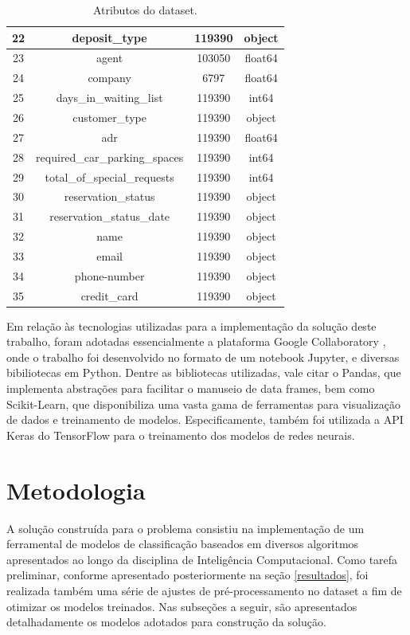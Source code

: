 \documentclass{homework}
\begin{document}
\begin{table}[h!]
\begin{tabular}{|c|c|c|c|}
        \hline
        22 & deposit\_type & 119390 & object \\
        \hline
        23 & agent & 103050 & float64 \\
        \hline
        24 & company & 6797 & float64 \\
        \hline
        25 & days\_in\_waiting\_list & 119390 & int64 \\
        \hline
        26 & customer\_type & 119390 & object \\
        \hline
        27 & adr & 119390 & float64 \\
        \hline
        28 & required\_car\_parking\_spaces & 119390 & int64 \\
        \hline
        29 & total\_of\_special\_requests & 119390 & int64 \\
        \hline
        30 & reservation\_status & 119390 & object \\
        \hline
        31 & reservation\_status\_date & 119390 & object \\
        \hline
        32 & name & 119390 & object \\
        \hline
        33 & email & 119390 & object \\
        \hline
        34 & phone-number & 119390 & object \\
        \hline
        35 & credit\_card & 119390 & object \\
        \hline
    \end{tabular}
    \caption{Atributos do dataset.}
    \label{attributes}
\end{table}

Em relação às tecnologias utilizadas para a implementação da solução deste trabalho, foram adotadas essencialmente a
plataforma Google Collaboratory \cite{colab}, onde o trabalho foi desenvolvido no formato de um notebook Jupyter, e
diversas bibiliotecas em Python. Dentre as bibliotecas utilizadas, vale citar o Pandas, que implementa abstrações para
facilitar o manuseio de data frames, bem como Scikit-Learn, que disponibiliza uma vasta gama de ferramentas para
visualização de dados e treinamento de modelos. Especificamente, também foi utilizada a API Keras do TensorFlow para o treinamento dos modelos de redes neurais.

\section{Metodologia}

A solução construída para o problema consistiu na implementação de um ferramental de modelos de classificação baseados
em diversos algoritmos apresentados ao longo da disciplina de Inteligência Computacional. Como tarefa preliminar,
conforme apresentado posteriormente na seção \ref{resultados}, foi realizada também uma série de ajustes de
pré-processamento no dataset a fim de otimizar os modelos treinados. Nas subseções a seguir, são apresentados
detalhadamente os modelos adotados para construção da solução.
\end{document}

